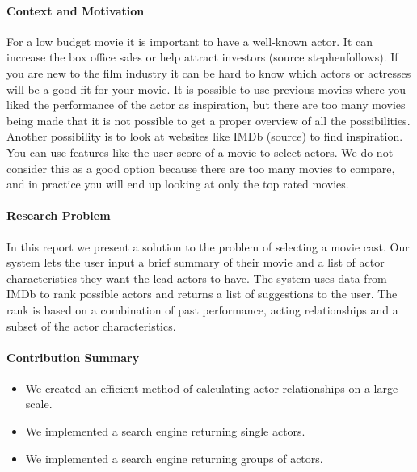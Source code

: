 
\noindent

\paragraph{Context and Motivation}
For a low budget movie it is important to have a well-known actor. It can increase the box office sales or help attract investors (source stephenfollows).
If you are new to the film industry it can be hard to know which actors or actresses will be a good fit for your movie.
It is possible to use previous movies where you liked the performance of the actor as inspiration, but there are too many movies
being made that it is not possible to get a proper overview of all the possibilities. Another possibility is to look at websites like
IMDb (source) to find inspiration. You can use features like the user score of a movie to select actors. We do not consider this
as a good option because there are too many movies to compare, and in practice you will end up looking at only the top rated movies.

\paragraph{Research Problem}
In this report we present a solution to the problem of selecting a movie cast. Our system lets the user input a brief summary of their
movie and a list of actor characteristics they want the lead actors to have. The system uses data from IMDb to rank possible actors
and returns a list of suggestions to the user. The rank is based on a combination of past performance, acting relationships and
a subset of the actor characteristics. 

\paragraph{Contribution Summary}
\begin{itemize}
\item We created an efficient method of calculating actor relationships on a large scale.
\item We implemented a search engine returning single actors.
\item We implemented a search engine returning groups of actors.
\end{itemize}